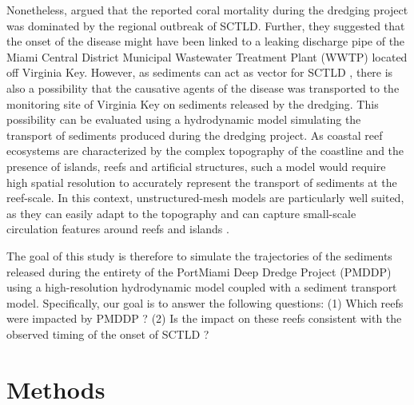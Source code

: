 \documentclass[preprint,12pt,authoryear]{elsarticle}
\begin{document}
Nonetheless, \cite{gintert2019regional} argued that the reported coral mortality during the dredging project was dominated by the regional outbreak of SCTLD. Further, they suggested that the onset of the disease might have been linked to a leaking discharge pipe of the Miami Central District Municipal Wastewater Treatment Plant (WWTP) located off Virginia Key. However, as sediments can act as vector for SCTLD \citep{studivan2022reef}, there is also a possibility that the causative agents of the disease was transported to the monitoring site of Virginia Key on sediments released by the dredging. This possibility can be evaluated using a hydrodynamic model simulating the transport of sediments produced during the dredging project. As coastal reef ecosystems are characterized by the complex topography of the coastline and the presence of islands, reefs and artificial structures, such a model would require high spatial resolution to accurately represent the transport of sediments at the reef-scale. In this context, unstructured-mesh models are particularly well suited, as they can easily adapt to the topography \citep{fringer2019future} and can capture small-scale circulation features around reefs and islands \citep{lambrechts2008multi}.

The goal of this study is therefore to simulate the trajectories of the sediments released during the entirety of the PortMiami Deep Dredge Project (PMDDP) using a high-resolution hydrodynamic model coupled with a sediment transport model. Specifically, our goal is to answer the following questions: (1) Which reefs were impacted by PMDDP ? (2) Is the impact on these reefs consistent with the observed timing of the onset of SCTLD ? 

\section{Methods}
\end{document}
